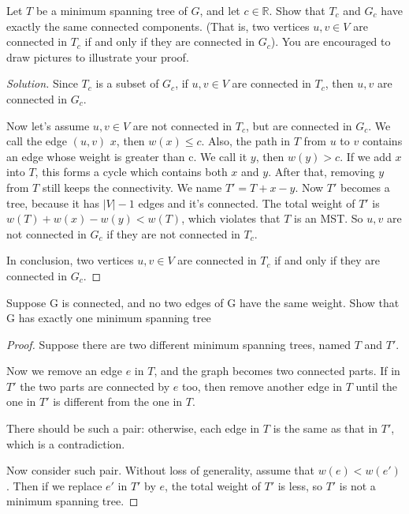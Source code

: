 



\maketitle

\begin{thm}{}{}
    Let $T$ be a minimum spanning tree of $G$, and let $c\in \mathbb{R}$.
    Show that $T_c$ and $G_c$ have exactly the same connected components. (That is, two vertices $u,v\in V$ are connected in $T_c$ if and only if they are connected in $G_c$).
    You are encouraged to draw pictures to illustrate your proof.
\end{thm}
\begin{proof}[Solution]
    Since $T_c$ is a subset of $G_c$, if $u,v\in V$ are connected in $T_c$, then $u,v$ are connected in $G_c$.

    Now let's assume $u,v\in V$ are not connected in $T_c$, but are connected in $G_c$.
    We call the edge $(u,v)$ $x$, then $w(x)\leq c$.
    Also, the path in $T$ from $u$ to $v$ contains an edge whose weight is greater than c.
    We call it $y$, then $w(y)>  c$.
    If we add $x$ into $T$, this forms a cycle which contains both $x$ and $y$.
    After that, removing $y$ from $T$ still keeps the connectivity.
    We name $T'=T+x-y$.
    Now $T'$ becomes a tree, because it has $|V|-1$ edges and it's connected.
    The total weight of  $T'$ is $w(T)+w(x)-w(y)<w(T)$, which violates that $T$ is an MST\@.
    So $u,v$ are not connected in $G_c$ if they are not connected in $T_c$.

    In conclusion, two vertices $u,v\in V$ are connected in $T_c$ if and only if they are connected in $G_c$.
\end{proof}
\begin{thm}{}{}
    Suppose G is connected, and no two edges of G have the same weight. Show that G has exactly one minimum spanning tree
\end{thm}
\begin{proof}[Proof]
    Suppose there are two different minimum spanning trees, named $T$ and $T'$. 

    Now we remove an edge $e$ in $T$, and the graph becomes two connected parts. 
    If in $T'$ the two parts are connected by $e$ too, 
    then remove another edge in $T$ until the one in $T'$ is different from the one in $T$. 

    There should be such a pair: otherwise, each edge in $T$ is the same as that in $T'$, which is a contradiction. 

    Now consider such pair. Without loss of generality, assume that $w(e)<w(e')$. 
    Then if we replace $e'$ in $T'$ by $e$, the total weight of $T'$ is less, so $T'$ is not a minimum spanning tree. 
\end{proof}

